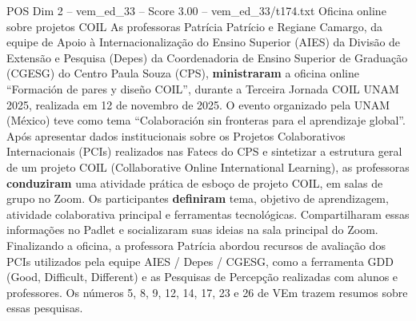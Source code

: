 \begin{textsample}{POS Dim 2 – vem\_ed\_33 – Score 3.00 – vem\_ed\_33/t174.txt}  \label{ex:f2_pos_144}
Oficina online sobre projetos COIL As professoras Patrícia Patrício e Regiane Camargo, da equipe de Apoio à Internacionalização do Ensino Superior (AIES) da Divisão de Extensão e Pesquisa (Depes) da Coordenadoria de Ensino Superior de Graduação (CGESG) do Centro Paula Souza (CPS), \textbf{ministraram} a oficina online “Formación de pares y diseño COIL”, durante a Terceira Jornada COIL UNAM 2025, realizada em 12 de novembro de 2025.
O evento organizado pela UNAM (México) teve como tema “Colaboración sin fronteras para el aprendizaje global”.
Após apresentar dados institucionais sobre os Projetos Colaborativos Internacionais (PCIs) realizados nas Fatecs do CPS e sintetizar a estrutura geral de um projeto COIL (Collaborative Online International Learning), as professoras \textbf{conduziram} uma atividade prática de esboço de projeto COIL, em salas de grupo no Zoom.
Os participantes \textbf{definiram} tema, objetivo de aprendizagem, atividade colaborativa principal e ferramentas tecnológicas.
Compartilharam essas informações no Padlet e socializaram suas ideias na sala principal do Zoom.
Finalizando a oficina, a professora Patrícia abordou recursos de avaliação dos PCIs utilizados pela equipe AIES / Depes / CGESG, como a ferramenta GDD (Good, Difficult, Different) e as Pesquisas de Percepção realizadas com alunos e professores.
Os números 5, 8, 9, 12, 14, 17, 23 e 26 de VEm trazem resumos sobre essas pesquisas.

\end{textsample}
